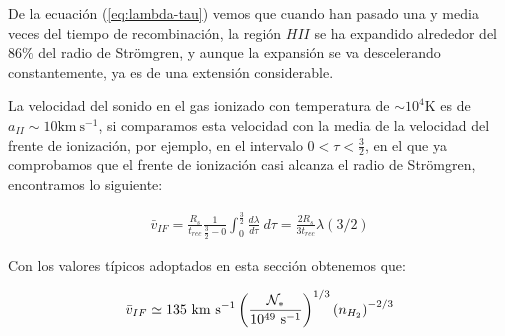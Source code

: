 De la ecuación (\ref{eq:lambda-tau}) vemos que cuando han pasado una y media veces del tiempo de recombinación,  la región $HII$ se ha expandido alrededor del $86\mathrm{\%}$ del radio de Strömgren, y aunque la expansión se va descelerando constantemente, ya es de una extensión considerable.

La velocidad del sonido en el gas ionizado con temperatura de $\sim 10^4\mathrm{K}$ es de $a_{II}\sim 10\mathrm{km~s^{-1}}$, si comparamos esta velocidad con la media de la velocidad del frente de ionización, por ejemplo, en el intervalo $0< \tau < \frac{3}{2}$, en el que ya comprobamos que el frente de ionización casi alcanza el radio de Strömgren, encontramos lo siguiente:

\begin{align}
  \bar{v}_{IF} = \frac{R_s}{t_{rec}}\frac{1}{\frac{3}{2}- 0}\int^{\frac{3}{2}}_0 \frac{d\lambda}{d\tau}~d\tau = \frac{2R_s}{3t_{rec}}\lambda\left(3/2\right)
\end{align}

Con los valores típicos adoptados en esta sección obtenemos que:

\begin{align}
  \bar{v}_{IF}\simeq 135\mathrm{~km~s^{-1}}\left(\frac{\mathcal{N}_*}{10^{49}\mathrm{~s^{-1}}}\right)^{1/3}\left(n_{H_2}\right)^{-2/3}
\end{align}




